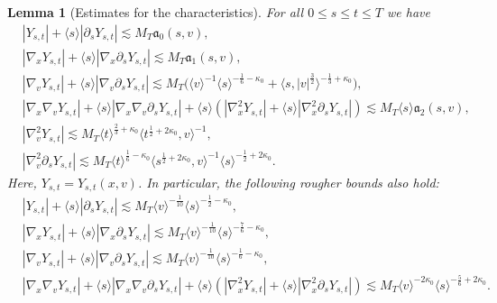 \documentclass[10pt,a4paper]{amsart}
\theoremstyle{plain}
\newtheorem{lemma}[theorem]{Lemma}
\begin{document}
	\begin{lemma} [Estimates for the characteristics]\label{keyle}  
	For all $0\le s\le t\le T$ we have
	\begin{align}\label{n13}
		&	|Y_{s,t}|+\langle s\rangle	|\partial_sY_{s,t}|\lesssim   M_T\mathfrak{a}_0(s,v),\\
		&\label{n14}	|\nabla_xY_{s,t}|+\langle s\rangle	|\nabla_x\partial_sY_{s,t}|\lesssim  M_T\mathfrak{a}_1(s,v),\\
		&\label{xf}|\nabla_vY_{s,t}|+\langle s\rangle	|\nabla_v\partial_sY_{s,t}|\lesssim  M_T\big(\langle v\rangle^{-1}\langle s\rangle^{-\frac{1}{6}-\kappa_0}+\langle s,|v|^{\frac{3}{2}}\rangle^{-\frac{1}{3}+\kappa_0}\big),\\
		&\label{n15}	|\nabla_x\nabla_vY_{s,t}|+\langle s\rangle 	|\nabla_x\nabla_v\partial_sY_{s,t}|+\langle s\rangle(	|\nabla_x^2Y_{s,t}|+\langle s\rangle	|\nabla_x^2\partial_sY_{s,t}|)\lesssim  M_T\langle s\rangle\mathfrak{a}_2(s,v),\\
		&\label{n17}|\nabla_v^2Y_{s,t}|\lesssim M_T	\langle t\rangle^{\frac{2}{3}+\kappa_0}	\langle t^{\frac{1}{2}+2\kappa_0},v\rangle^{-1}
		,\\&\label{n17b}
		|\nabla_v^2\partial_sY_{s,t}|\lesssim	M_T\langle t\rangle^{\frac{1}{6}-\kappa_0}	\langle s^{\frac12+2\kappa_0},v\rangle^{-1}
		\langle s\rangle^{-\frac12+2\kappa_0}.
	\end{align}
	Here, $Y_{s,t}=Y_{s,t}(x,v)$. In particular, the following
	rougher bounds also hold:
	\begin{align}\label{n13'}
		&	|Y_{s,t}|+\langle s\rangle	|\partial_sY_{s,t}|\lesssim   M_T
		\langle v\rangle^{-\frac{1}{10}}\langle s\rangle^{-\frac12-\kappa_0}	,\\&\label{n14'}	|\nabla_xY_{s,t}|+\langle s\rangle	|\nabla_x\partial_sY_{s,t}|\lesssim  M_T\langle v\rangle^{-\frac{1}{10}}\langle s\rangle^{-\frac{7}{6}-\kappa_0}
		,\\&\label{xf'}
		|\nabla_vY_{s,t}|+\langle s\rangle	|\nabla_v\partial_sY_{s,t}|\lesssim  M_T\langle v\rangle^{-\frac{1}{10}}\langle s\rangle^{-\frac{1}{6}-\kappa_0},\\
		&\label{n15'}	|\nabla_x\nabla_vY_{s,t}|+\langle s\rangle 	|\nabla_x\nabla_v\partial_sY_{s,t}|+\langle s\rangle(	|\nabla_x^2Y_{s,t}|+\langle s\rangle	|\nabla_x^2\partial_sY_{s,t}|)\lesssim  M_T\langle v\rangle^{-2\kappa_0}  \langle s\rangle^{-\frac{5}{6}+2\kappa_0}.
	\end{align}
\end{lemma}
\end{document}
